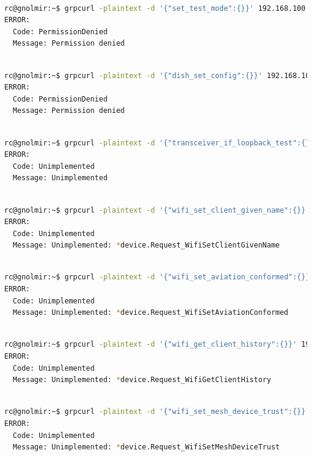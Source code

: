 \documentclass[IN,11pt,twoside,openright,bachelor,english]{tumthesis}
\begin{document}
\begin{lstlisting}[language=bash,basicstyle=\tiny]

rc@gnolmir:~$ grpcurl -plaintext -d '{"set_test_mode":{}}' 192.168.100.1:9200 SpaceX.API.Device.Device/Handle
ERROR:
  Code: PermissionDenied
  Message: Permission denied
  \end{lstlisting}
\begin{lstlisting}[language=bash,basicstyle=\tiny]

rc@gnolmir:~$ grpcurl -plaintext -d '{"dish_set_config":{}}' 192.168.100.1:9200 SpaceX.API.Device.Device/Handle
ERROR:
  Code: PermissionDenied
  Message: Permission denied
  \end{lstlisting}
\begin{lstlisting}[language=bash,basicstyle=\tiny]

rc@gnolmir:~$ grpcurl -plaintext -d '{"transceiver_if_loopback_test":{}}' 192.168.100.1:9200 SpaceX.API.Device.Device/Handle
ERROR:
  Code: Unimplemented
  Message: Unimplemented
  \end{lstlisting}
\begin{lstlisting}[language=bash,basicstyle=\tiny]

rc@gnolmir:~$ grpcurl -plaintext -d '{"wifi_set_client_given_name":{}}' 192.168.100.1:9200 SpaceX.API.Device.Device/Handle
ERROR:
  Code: Unimplemented
  Message: Unimplemented: *device.Request_WifiSetClientGivenName
  \end{lstlisting}
\begin{lstlisting}[language=bash,basicstyle=\tiny]

rc@gnolmir:~$ grpcurl -plaintext -d '{"wifi_set_aviation_conformed":{}}' 192.168.100.1:9200 SpaceX.API.Device.Device/Handle
ERROR:
  Code: Unimplemented
  Message: Unimplemented: *device.Request_WifiSetAviationConformed
  \end{lstlisting}
\begin{lstlisting}[language=bash,basicstyle=\tiny]

rc@gnolmir:~$ grpcurl -plaintext -d '{"wifi_get_client_history":{}}' 192.168.100.1:9200 SpaceX.API.Device.Device/Handle
ERROR:
  Code: Unimplemented
  Message: Unimplemented: *device.Request_WifiGetClientHistory
  \end{lstlisting}
\begin{lstlisting}[language=bash,basicstyle=\tiny]

rc@gnolmir:~$ grpcurl -plaintext -d '{"wifi_set_mesh_device_trust":{}}' 192.168.100.1:9200 SpaceX.API.Device.Device/Handle
ERROR:
  Code: Unimplemented
  Message: Unimplemented: *device.Request_WifiSetMeshDeviceTrust
  \end{lstlisting}
\end{document}
